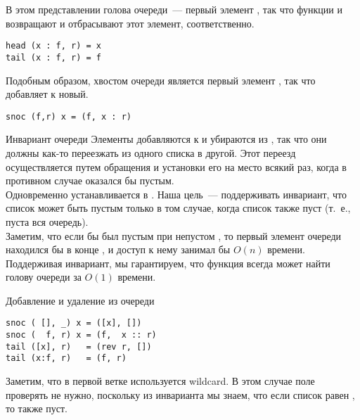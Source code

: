 \begin{frame}[fragile]{}
В этом представлении голова очереди~--- первый элемент ,
так что функции  и 
возвращают и отбрасывают этот элемент, соответственно.
\begin{verbatim}
head (x : f, r) = x
tail (x : f, r) = f
\end{verbatim}
Подобным образом, хвостом очереди является первый элемент
, так что  добавляет к 
новый.
\begin{verbatim}
snoc (f,r) x = (f, x : r)
\end{verbatim}

\end{frame}


\begin{frame}[fragile]{Инвариант очереди}
Элементы добавляются к  и убираются из , так
что они должны как-то переезжать из одного списка в другой. Этот
переезд осуществляется путем обращения  и установки его
на место  всякий раз, когда в противном случае
 оказался бы пустым.\\

 Одновременно 
устанавливается в \hsinline{[]}. Наша цель~--- поддерживать
инвариант, что список  может быть пустым только в том
случае, когда список  также пуст (т.~е., пуста вся
очередь). \\

Заметим, что если бы  был пустым при непустом
, то первый элемент очереди находился бы в конце
, и доступ к нему занимал бы $O(n)$ времени. Поддерживая
инвариант, мы гарантируем, что функция  всегда может
найти голову очереди за $O(1)$ времени.

\end{frame}


\begin{frame}[fragile]{Добавление и удаление из очереди}
\begin{verbatim}
snoc ( [], _) x = ([x], [])
snoc (  f, r) x = (f,  x :: r)
tail ([x], r)   = (rev r, [])
tail (x:f, r)   = (f, r)
\end{verbatim}

Заметим, что в первой ветке  используется
wildcard. В этом случае поле  проверять не нужно,
поскольку из инварианта мы знаем, что если список  равен
\hsinline{[]}, то  также пуст.

\end{frame}


